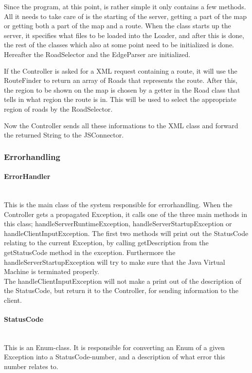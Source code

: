 \documentclass[a4paper,10pt,titlepage]{article}
\begin{document}
Since the program, at this point, is rather simple it only contains a few methods. All it needs to take care of is the starting of the server, getting a part of the map or getting both a part of the map and a route. When the class starts up the server, it specifies what files to be loaded into the Loader, and after this is done, the rest of the classes which also at some point need to be initialized is done. Hereafter the RoadSelector and the EdgeParser are initialized.

If the Controller is asked for a XML request containing a route, it will use the RouteFinder to return an array of Roads that represents the route. After this, the region to be shown on the map is chosen by a getter in the Road class that tells in what region the route is in. This will be used to select the appropriate region of roads by the RoadSelector.

Now the Controller sends all these informations to the XML class and forward the returned String to the JSConnector.


					
			\subsubsection{Errorhandling}
				
				\paragraph{ErrorHandler}\mbox{}\\
This is the main class of the system responsible for errorhandling. When the Controller gets a propagated Exception, it calls one of the three main methods in this class; handleServerRuntimeException, handleServerStartupException or handleClientInputException. The first two methods will print out the StatusCode relating to the current Exception, by calling getDescription from the getStatusCode method in the exception. Furthermore the handleServerStartupException will try to make sure that the Java Virtual Machine is terminated properly.\\
The handleClientInputException will not make a print out of the description of the StatusCode, but return it to the Controller, for sending information to the client.

				\paragraph{StatusCode}\mbox{}\\
This is an Enum-class. It is responsible for converting an Enum of a given Exception into a StatusCode-number, and a description of what error this number relates to.
				
\end{document}
